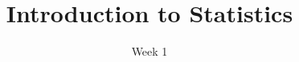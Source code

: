 \title{Introduction to Statistics}
\date{Week 1}








\thispagestyle{plain}
\graphicspath{{lectures/week01/}}



%

%


